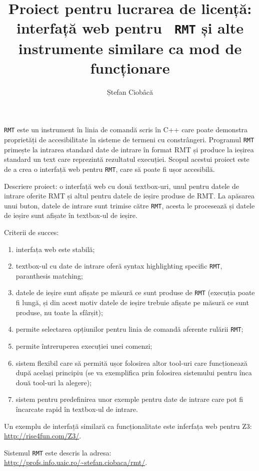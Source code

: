 \documentclass[10pt]{article}
\title{Proiect pentru lucrarea de licență: interfață web pentru {\tt
    RMT} și alte instrumente similare ca mod de funcționare}
\author{Ștefan Ciobâcă}
\begin{document}
\maketitle

{\tt RMT} este un instrument în linia de comandă scris în C++ care
poate demonstra proprietăți de accesibilitate în sisteme de termeni cu
constrângeri. Programul {\tt RMT} primește la intrarea standard date
de intrare în format RMT și produce la ieșirea standard un text care
reprezintă rezultatul execuției. Scopul acestui proiect este de a crea
o interfață web pentru {\tt RMT}, care să poate fi ușor accesibilă.

Descriere proiect: o interfață web cu două textbox-uri, unul pentru
datele de intrare oferite RMT și altul pentru datele de ieșire produse
de RMT. La apăsarea unui buton, datele de intrare sunt trimise către
{\tt RMT}, acesta le procesează și datele de ieșire sunt afișate în
textbox-ul de ieșire.

Criterii de succes:

\begin{enumerate}

\item interfața web este stabilă;

\item textbox-ul cu date de intrare oferă syntax highlighting
  specific {\tt RMT}, paranthesis matching;

\item datele de ieșire sunt afișate pe măsură ce sunt produse de
  {\tt RMT} (execuția poate fi lungă, și din acest motiv datele de
  ieșire trebuie afișate pe măsură ce sunt produse, nu toate la
  sfârșit);

\item permite selectarea opțiunilor pentru linia de comandă aferente
  rulării {\tt RMT};

\item permite întreruperea execuției unei comenzi;

\item sistem flexibil care să permită ușor folosirea altor tool-uri
  care funcționează după același principiu (se va exemplifica prin
  folosirea sistemului pentru înca două tool-uri la alegere);

\item sistem pentru predefinirea unor exemple pentru date de intrare
  care pot fi încarcate rapid în textbox-ul de intrare.

\end{enumerate}

Un exemplu de interfață similară ca funcționalitate este inferfața web
pentru Z3: \url{http://rise4fun.com/Z3/}.

Sistemul {\tt RMT} este descris la adresa:
\url{http://profs.info.uaic.ro/~stefan.ciobaca/rmt/}.
\end{document}
